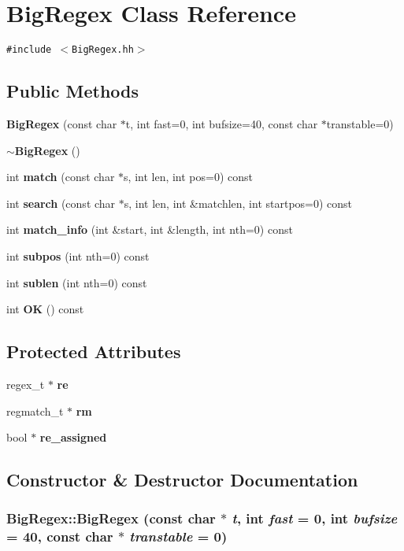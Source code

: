 \section{Big\-Regex  Class Reference}
\label{classBigRegex}
{\tt \#include $<$Big\-Regex.hh$>$}

\subsection*{Public Methods}
\begin{CompactItemize}
\item 
{\bf Big\-Regex} (const char $\ast$t, int fast=0, int bufsize=40, const char $\ast$transtable=0)
\item 
{\bf $\sim$Big\-Regex} ()
\item 
int {\bf match} (const char $\ast$s, int len, int pos=0) const
\item 
int {\bf search} (const char $\ast$s, int len, int \&matchlen, int startpos=0) const
\item 
int {\bf match\_\-info} (int \&start, int \&length, int nth=0) const
\item 
int {\bf subpos} (int nth=0) const
\item 
int {\bf sublen} (int nth=0) const
\item 
int {\bf OK} () const
\end{CompactItemize}
\subsection*{Protected Attributes}
\begin{CompactItemize}
\item 
regex\_\-t $\ast$ {\bf re}
\item 
regmatch\_\-t $\ast$ {\bf rm}
\item 
bool $\ast$ {\bf re\_\-assigned}
\end{CompactItemize}


\subsection{Constructor \& Destructor Documentation}
\subsubsection{\setlength{\rightskip}{0pt plus 5cm}Big\-Regex::Big\-Regex (const char $\ast$ {\em t}, int {\em fast} = 0, int {\em bufsize} = 40, const char $\ast$ {\em transtable} = 0)}\label{classBigRegex_a0}




